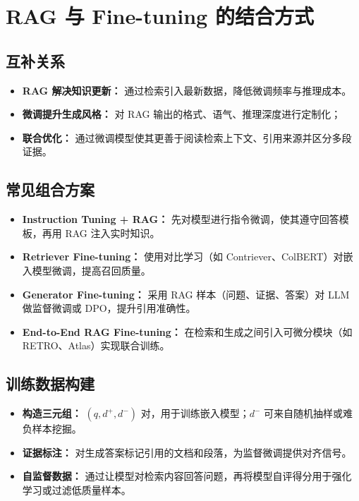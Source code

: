 \documentclass[UTF8,zihao=-4]{ctexart}
\begin{document}
\section{RAG 与 Fine-tuning 的结合方式}
\subsection{互补关系}
\begin{itemize}
  \item \textbf{RAG 解决知识更新：} 通过检索引入最新数据，降低微调频率与推理成本。
  \item \textbf{微调提升生成风格：} 对 RAG 输出的格式、语气、推理深度进行定制化；
  \item \textbf{联合优化：} 通过微调模型使其更善于阅读检索上下文、引用来源并区分多段证据。
\end{itemize}

\subsection{常见组合方案}
\begin{itemize}
  \item \textbf{Instruction Tuning + RAG：} 先对模型进行指令微调，使其遵守回答模板，再用 RAG 注入实时知识。
  \item \textbf{Retriever Fine-tuning：} 使用对比学习（如 Contriever、ColBERT）对嵌入模型微调，提高召回质量。
  \item \textbf{Generator Fine-tuning：} 采用 RAG 样本（问题、证据、答案）对 LLM 做监督微调或 DPO，提升引用准确性。
  \item \textbf{End-to-End RAG Fine-tuning：} 在检索和生成之间引入可微分模块（如 RETRO、Atlas）实现联合训练。
\end{itemize}

\subsection{训练数据构建}
\begin{itemize}
  \item \textbf{构造三元组：} $(q, d^+, d^-)$ 对，用于训练嵌入模型；$d^-$ 可来自随机抽样或难负样本挖掘。
  \item \textbf{证据标注：} 对生成答案标记引用的文档和段落，为监督微调提供对齐信号。
  \item \textbf{自监督数据：} 通过让模型对检索内容回答问题，再将模型自评得分用于强化学习或过滤低质量样本。
\end{itemize}
\end{document}
